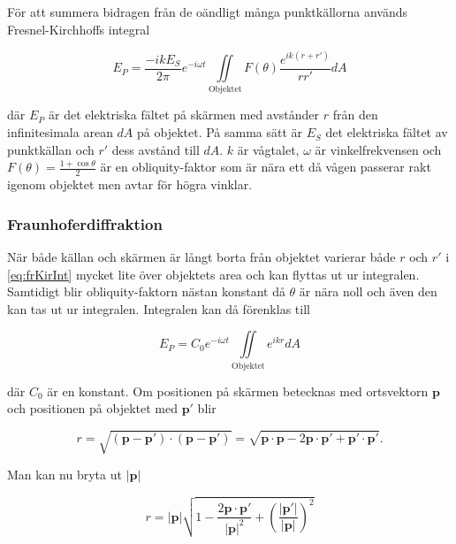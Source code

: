 \documentclass[a4paper]{article}
\begin{document}
För att summera bidragen från de oändligt många punktkällorna används Fresnel-Kirchhoffs integral \cite[p.~330]{pearsonIntroOpt}

\begin{equation}
	E_P = \frac{-i k E_S}{2\pi} e^{-i \omega t} \iint\limits_{\mathrm{Objektet}} {F(\theta)\frac{e^{i k (r + r')}}{r r'} d A}
	\label{eq:frKirInt}
\end{equation}

där $E_P$ är det elektriska fältet på skärmen med avstånder $r$ från den infinitesimala arean $d A$ på objektet. På samma sätt är $E_S$ det elektriska fältet av punktkällan och $r'$ dess avstånd till $d A$. $k$ är vågtalet, $\omega$ är vinkelfrekvensen och $F(\theta) = \frac{1 + \cos\theta}{2}$ är en obliquity-faktor som är nära ett då vågen passerar rakt igenom objektet men avtar för högra vinklar.

\subsubsection{Fraunhoferdiffraktion}

När både källan och skärmen är långt borta från objektet varierar både $r$ och $r'$ i \eqref{eq:frKirInt} mycket lite över objektets area och kan flyttas ut ur integralen. Samtidigt blir obliquity-faktorn nästan konstant då $\theta$ är nära noll och även den kan tas ut ur integralen. Integralen kan då förenklas till \cite[p.~331]{pearsonIntroOpt}

\begin{equation}
	E_P = C_0 e^{-i \omega t} \iint\limits_{\mathrm{Objektet}} {e^{i k r} dA}
	\label{eq:fraunhofer}
\end{equation}

där $C_0$ är en konstant. Om positionen på skärmen betecknas med ortsvektorn $\boldsymbol{p}$ och positionen på objektet med $\boldsymbol{p'}$ blir

\begin{equation}
	r = \sqrt{(\boldsymbol{p} - \boldsymbol{p'})\cdot(\boldsymbol{p} - \boldsymbol{p'})} = \sqrt{\boldsymbol{p}\cdot\boldsymbol{p} - 2 \boldsymbol{p}\cdot\boldsymbol{p'} + \boldsymbol{p'}\cdot\boldsymbol{p'}}\text{.}
\end{equation}

Man kan nu bryta ut $|\boldsymbol{p}|$

\begin{equation}
r = |\boldsymbol{p}|\sqrt{1 - \frac{2\boldsymbol{p}\cdot\boldsymbol{p'}}{|\boldsymbol{p}|^2} + \left(\frac{|\boldsymbol{p'}|}{|\boldsymbol{p}|}\right)^2}
\end{equation}
\end{document}
